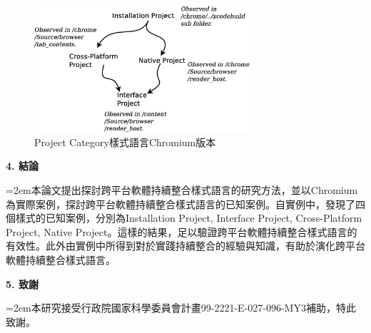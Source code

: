 \documentclass[10pt, twocolumn]{article}
\begin{document}
\begin{figure}
\begin{center}
\includegraphics[width=8cm]{chromium-project-category-analysis-view.eps}
\caption{Project Category樣式語言\textendash\hspace{4pt}Chromium版本}
\label{chromium-project-category-analysis-view}
\end{center}
\end{figure}




\begin{raggedright}\textbf{4. 結論}\end{raggedright}

\parindent=2em本論文提出探討跨平台軟體持續整合樣式語言的研究方法，並以Chromium為實際案例，探討跨平台軟體持續整合樣式語言的已知案例。自實例中，發現了四個樣式的已知案例，分別為Installation Project, Interface Project, Cross-Platform Project, Native Project。這樣的結果，足以驗證跨平台軟體持續整合樣式語言的有效性。此外由實例中所得到對於實踐持續整合的經驗與知識，有助於演化跨平台軟體持續整合樣式語言。

\begin{raggedright}\textbf{5. 致謝}\end{raggedright}

\parindent=2em本研究接受行政院國家科學委員會計畫99-2221-E-027-096-MY3補助，特此致謝。



\end{document}
